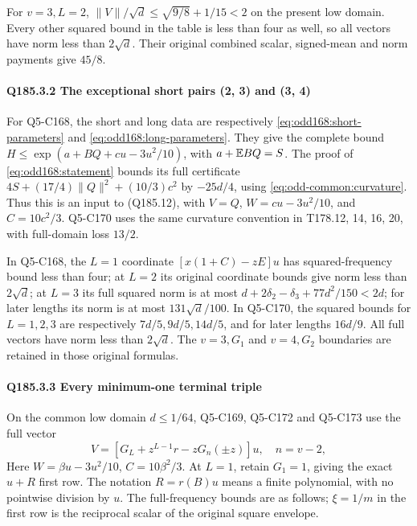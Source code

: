 For \(v=3,\allowbreak \allowbreak  L=2\), \(\|V\|/\sqrt d\le\sqrt{9/8}+1/15<2\) on the present low domain. Every other squared bound in the table is less than four as well, so all vectors have norm less than \(2\sqrt d\). Their original combined scalar, signed-mean and norm payments give \(45/8\).

\paragraph{Q185.3.2 The exceptional short pairs (2, 3) and (3, 4)}

For Q5-C168, the short and long data are respectively
\eqref{eq:odd168:short-parameters} and \eqref{eq:odd168:long-parameters}.
They give the complete bound
\(H\le\exp(a+BQ+cu-3u^2/10)\), with \(a+\mathbb E BQ=S\).
The proof of \eqref{eq:odd168:statement} bounds its full certificate
\(4S+(17/4)\|Q\|^2+(10/3)c^2\) by \(-25d/4\), using
\eqref{eq:odd-common:curvature}. Thus this is an input to
(Q185.12), with \(V=Q\), \(W=cu-3u^2/10\), and \(C=10c^2/3\).
Q5-C170 uses the same curvature convention in T178.12, 14, 16, 20,
with full-domain loss \(13/2\).

In Q5-C168, the \(L=1\) coordinate \([x(1+C)-zE]u\) has squared-frequency bound less than four; at \(L=2\) its original coordinate bounds give norm less than \(2\sqrt d\); at \(L=3\) its full squared norm is at most \(d+2 \delta_2- \delta_3+77d^2/150<2d\); for later lengths its norm is at most \(131\sqrt d/100\). In Q5-C170, the squared bounds for \(L=1,\allowbreak \allowbreak  2,\allowbreak \allowbreak  3\) are respectively \(7d/5,\allowbreak \allowbreak  9d/5,\allowbreak \allowbreak  14d/5\), and for later lengths \(16d/9\). All full vectors have norm less than \(2\sqrt d\). The \(v=3,\allowbreak \allowbreak  G_1\) and \(v=4,\allowbreak \allowbreak  G_2\) boundaries are retained in those original formulas.

\paragraph{Q185.3.3 Every minimum-one terminal triple}

On the common low domain \(d\le1/64\), Q5-C169, Q5-C172 and Q5-C173 use the full vector
\[
 V=[G_L+z^{L-1}r-zG_n(\pm z)]u,\quad n=v-2,           \tag{Q185.15}
\]
Here \(W=\beta u-3u^2/10\), \(C=10\beta^2/3\). At \(L=1\), retain \(G_1=1\), giving the exact \(u+R\) first row. The notation \(R=r(B)u\) means a finite polynomial, with no pointwise division by \(u\). The full-frequency bounds are as follows; \(\xi=1/m\) in the first row is the reciprocal scalar of the original square envelope.


